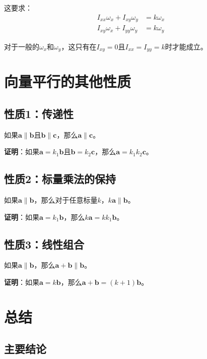 \documentclass[12pt,a4paper]{article}
\begin{document}
这要求：
\begin{align}
I_{xx} \omega_x + I_{xy} \omega_y &= k \omega_x \\
I_{xy} \omega_x + I_{yy} \omega_y &= k \omega_y
\end{align}

对于一般的$\omega_x$和$\omega_y$，这只有在$I_{xy} = 0$且$I_{xx} = I_{yy} = k$时才能成立。

\section{向量平行的其他性质}

\subsection{性质1：传递性}

如果$\bm{a} \parallel \bm{b}$且$\bm{b} \parallel \bm{c}$，那么$\bm{a} \parallel \bm{c}$。

\textbf{证明}：如果$\bm{a} = k_1 \bm{b}$且$\bm{b} = k_2 \bm{c}$，那么$\bm{a} = k_1 k_2 \bm{c}$。

\subsection{性质2：标量乘法的保持}

如果$\bm{a} \parallel \bm{b}$，那么对于任意标量$k$，$k \bm{a} \parallel \bm{b}$。

\textbf{证明}：如果$\bm{a} = k_1 \bm{b}$，那么$k \bm{a} = k k_1 \bm{b}$。

\subsection{性质3：线性组合}

如果$\bm{a} \parallel \bm{b}$，那么$\bm{a} + \bm{b} \parallel \bm{b}$。

\textbf{证明}：如果$\bm{a} = k \bm{b}$，那么$\bm{a} + \bm{b} = (k + 1) \bm{b}$。

\section{总结}

\subsection{主要结论}
\end{document}
